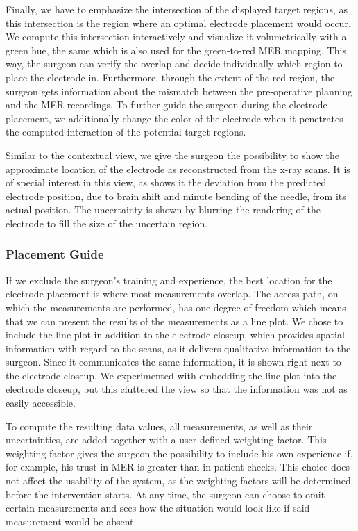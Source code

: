 \documentclass[review]{vgtc}                 %
\begin{document}
Finally, we have to emphasize the intersection of the displayed target regions, as this intersection is the region where an optimal electrode placement would occur. We compute this intersection interactively and visualize it volumetrically with a green hue, the same which is also used for the green-to-red MER mapping. This way, the surgeon can verify the overlap and decide individually which region to place the electrode in. Furthermore, through the extent of the red region, the surgeon gets information about the mismatch between the pre-operative planning and the MER recordings. To further guide the surgeon during the electrode placement, we additionally change the color of the electrode when it penetrates the computed interaction of the potential target regions.

Similar to the contextual view, we give the surgeon the possibility to show the approximate location of the electrode as reconstructed from the x-ray scans. It is of special interest in this view, as shows it the deviation from the predicted electrode position, due to brain shift and minute bending of the needle, from its actual position. The uncertainty is shown by blurring the rendering of the electrode to fill the size of the uncertain region.

\subsubsection{Placement Guide}\label{sec:overview:placement:guide}
If we exclude the surgeon's training and experience, the best location for the electrode placement is where most measurements overlap. The access path, on which the measurements are performed, has one degree of freedom which means that we can present the results of the measurements as a line plot. We chose to include the line plot in addition to the electrode closeup, which provides spatial information with regard to the scans, as it delivers qualitative information to the surgeon. Since it communicates the same information, it is shown right next to the electrode closeup. We experimented with embedding the line plot into the electrode closeup, but this cluttered the view so that the information was not as easily accessible.

To compute the resulting data values, all measurements, as well as their uncertainties, are added together with a user-defined weighting factor. This weighting factor gives the surgeon the possibility to include his own experience if, for example, his trust in MER is greater than in patient checks. This choice does not affect the usability of the system, as the weighting factors will be determined before the intervention starts. At any time, the surgeon can choose to omit certain measurements and sees how the situation would look like if said measurement would be absent.
\end{document}
